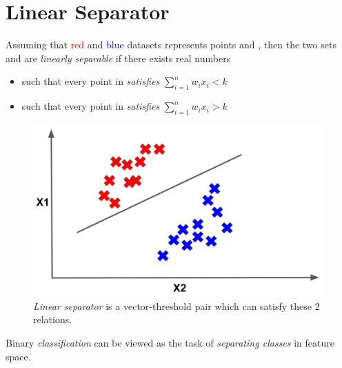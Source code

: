 \documentclass[
	number={2},
	title={Learning Linear Separators{,} SVMs and Kernels}
]{cs584notes}
\begin{document}
\newcommand{\predict}[2]{\textcolor{black}{\ \rightarrow\mbox{predict } (#1) \mbox{ #2}}}

\section{Linear Separator}\label{sec:linear-separator}
Assuming that \textcolor{red}{red} and \textcolor{blue}{blue} datasets represents points  and , then the two sets  and  are \emph{linearly separable} if there exists  real numbers 
\begin{itemize}
	\item such that every point in  \emph{satisfies} $\sum_{i=1}^{n} w_{i}x_{i} < k$
	\item such that every point in  \emph{satisfies} $\sum_{i=1}^{n} w_{i}x_{i} > k$
\end{itemize}

\begin{figure}[H]
	\centering
	\includegraphics[width=\textwidth]{figures/2/linear_separator}
	\caption{\emph{Linear separator} is a vector-threshold pair  which can satisfy these 2 relations.}
	\label{fig:linear_separator}
\end{figure}

Binary \emph{classification}  can be viewed as the task of \emph{separating classes} in feature space.
\end{document}
